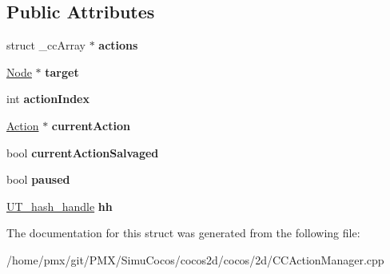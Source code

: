 \subsection*{Public Attributes}
\begin{DoxyCompactItemize}
\item 
\mbox{\label{struct__hashElement_aad474bf3a3c6b811ac11f96f6e1cbd31}} 
struct \+\_\+cc\+Array $\ast$ {\bfseries actions}
\item 
\mbox{\label{struct__hashElement_aa11ca3c171fb6a6b64ae9d17adbd6cf3}} 
\hyperlink{classNode}{Node} $\ast$ {\bfseries target}
\item 
\mbox{\label{struct__hashElement_a040815fc6b84fb078b37de409994c523}} 
int {\bfseries action\+Index}
\item 
\mbox{\label{struct__hashElement_ad93230670da1520e6db2d9b79ddfb3d7}} 
\hyperlink{classAction}{Action} $\ast$ {\bfseries current\+Action}
\item 
\mbox{\label{struct__hashElement_a153140976e1e248d8b13ea9de7b0f5bd}} 
bool {\bfseries current\+Action\+Salvaged}
\item 
\mbox{\label{struct__hashElement_aee7ba57bd1039efec5314ccb02e864c2}} 
bool {\bfseries paused}
\item 
\mbox{\label{struct__hashElement_a478c5e7c62426f22612799d32ee2234f}} 
\hyperlink{structUT__hash__handle}{U\+T\+\_\+hash\+\_\+handle} {\bfseries hh}
\end{DoxyCompactItemize}


The documentation for this struct was generated from the following file\+:\begin{DoxyCompactItemize}
\item 
/home/pmx/git/\+P\+M\+X/\+Simu\+Cocos/cocos2d/cocos/2d/C\+C\+Action\+Manager.\+cpp\end{DoxyCompactItemize}
